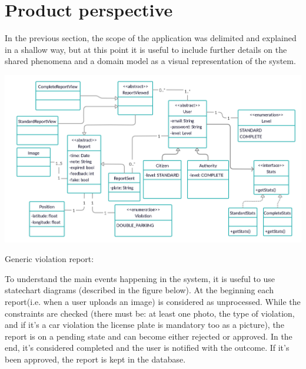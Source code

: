 \documentclass[a4paper, hidelinks, 12pt]{report}
\begin{document}
	    \section{Product perspective}\label{sec:product-perspective}
	    In the previous section, the scope of the application was delimited and explained in a shallow way, but at this point it is useful to include further details on the shared phenomena and a domain model as a visual representation of the system.
    \begin{center}
    \includegraphics[scale = 0.85]{assets/domainModel.png}\\[1.6 cm]
    \end{center}

    Generic violation report:

	    To understand the main events happening in the system, it is useful to use statechart diagrams (described in the figure below). At the beginning each report(i.e. when a user uploads an image) is considered as unprocessed. While the constraints are checked (there must be: at least one photo, the type of violation, and if it’s a car violation the license plate is mandatory too as a picture), the report is on a pending state and can become either rejected or approved. In the end, it’s considered completed and the user is notified with the outcome. If it’s been approved, the report is kept in the database.
\end{document}
